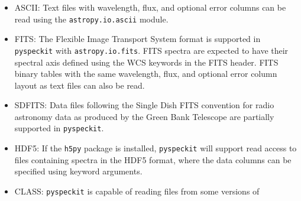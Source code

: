 \documentclass[twocolumn]{aastex62}
\newcommand{\pyspeckit}{\texttt{pyspeckit}\xspace}
\begin{document}
\begin{itemize}
    \item ASCII: Text files with wavelength, flux, and optional error
        columns can be read using the \texttt{astropy.io.ascii} module.
    \item FITS: The Flexible Image Transport System \citep[FITS;][]{Wells1981a,Greisen2006a,Pence2010a} format is
	supported in \pyspeckit with \texttt{astropy.io.fits}.  
    FITS spectra are expected to have their spectral axis defined using the WCS
    keywords in the FITS header.  FITS binary tables with the same
    wavelength, flux, and optional error column layout as text files
    can also be read.
    \item SDFITS: Data files following the Single
	Dish FITS \citep[SDFITS;][]{Garwood2000a} convention for radio astronomy data as
	produced by the Green Bank Telescope are partially supported in \pyspeckit.
    \item HDF5: 
        If the \texttt{h5py} package is installed, \pyspeckit will support read
        access to files containing spectra in the HDF5 format, where the data
        columns can be specified using keyword arguments.
    \item CLASS: \pyspeckit is capable of reading files from some versions of

\end{itemize}
\end{document}

